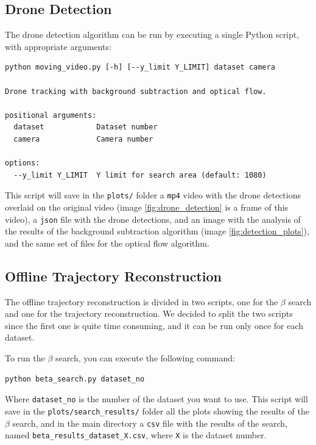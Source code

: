 \documentclass[11pt]{article}
\begin{document}
\subsection{Drone Detection}

The drone detection algorithm can be run by executing a single Python script, with appropriate arguments:

\begin{verbatim}
python moving_video.py [-h] [--y_limit Y_LIMIT] dataset camera

Drone tracking with background subtraction and optical flow.

positional arguments:
  dataset            Dataset number
  camera             Camera number

options:
  --y_limit Y_LIMIT  Y limit for search area (default: 1080)
\end{verbatim}

This script will save in the \texttt{plots/} folder a \texttt{mp4} video with the drone detections overlaid on the original video (image \ref{fig:drone_detection} is a frame of this video), a \texttt{json} file with the drone detections, and an image with the analysis of the results of the background subtraction algorithm (image \ref{fig:detection_plots}), and the same set of files for the optical flow algorithm.

\subsection{Offline Trajectory Reconstruction}

The offline trajectory reconstruction is divided in two scripts, one for the $\beta$ search and one for the trajectory reconstruction. We decided to split the two scripts since the first one is quite time consuming, and it can be run only once for each dataset.

To run the $\beta$ search, you can execute the following command:

\begin{verbatim}
python beta_search.py dataset_no
\end{verbatim}

Where \texttt{dataset\_no} is the number of the dataset you want to use. This script will save in the \texttt{plots/search\_results/} folder all the plots showing the results of the $\beta$ search, and in the main directory a \texttt{csv} file with the results of the search, named \texttt{beta\_results\_dataset\_X.csv}, where \texttt{X} is the dataset number.
\end{document}
